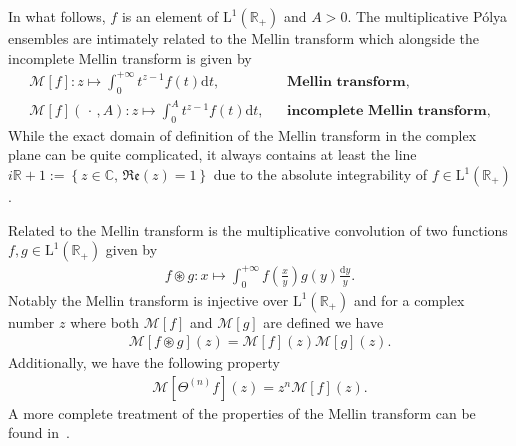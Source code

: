 \documentclass[pdflatex,sn-mathphys-num]{sn-jnl}
\theoremstyle{thmstyleone}
\numberwithin{equation}{section}
\newcommand{\R}{\mathbb{R}}
\newcommand{\C}{\mathbb{C}}
\begin{document}
In what follows, $f$ is an element of $\mathrm{L}^{1}\left(\R_{+}\right)$ and $A>0$. The multiplicative P\'olya ensembles are intimately related to the Mellin transform which alongside the incomplete Mellin transform is given by
\begin{align}\label{mellintransform1}
    \mathcal{M}\left [ f \right ]:z\mapsto \int_{0}^{+\infty}t^{z-1}f\left ( t \right )\mathrm{d}t, &&\textbf{Mellin transform},
    \\
    \mathcal{M}\left [ f \right ]\left(\,\cdot\,,A\right):z\mapsto \int_{0}^{A}t^{z-1}f\left ( t \right )\mathrm{d}t,&&\textbf{incomplete Mellin transform},\label{mellintransform1.inc}
\end{align}
While the exact domain of definition of the Mellin transform in the complex plane can be quite complicated, it always contains at least the line $i\R+1:=\left \{ z\in\C,\,\mathfrak{Re}\left ( z \right )=1 \right \}$ due to the absolute integrability of $f\in\mathrm{L}^{1}\left(\R_{+}\right)$.

Related to the Mellin transform is the multiplicative convolution of two functions $f,g\in\mathrm{L}^{1}\left(\R_{+}\right)$ given by
\begin{align}\label{multiplicativeconvolution}
    f\circledast g:x\mapsto \int_{0}^{+\infty}f\left ( \frac{x}{y} \right )g\left ( y \right )\frac{\mathrm{d}y}{y}.
\end{align}
Notably the Mellin transform is injective over $\mathrm{L}^{1}\left(\R_{+}\right)$ and for a complex number $z$ where both $\mathcal{M}\left [ f \right ]$ and $\mathcal{M}\left [ g \right ]$ are defined we have
\begin{align}
    \mathcal{M}\left [ f\circledast g \right ]\left(z\right)=\mathcal{M}\left [ f\right ]\left(z\right)\mathcal{M}\left [ g\right ]\left(z\right).
\end{align}
Additionally, we have the following property
\begin{align}\label{id:mellintheta}
    \mathcal{M}\left [ \Theta^{(n)}f\right ]\left(z\right)=z^{n}\mathcal{M}\left [ f\right ]\left(z\right).
\end{align}
A more complete treatment of the properties of the Mellin transform can be found in~\cite[Sec.~2]{kieburgProductsRandomMatrices2019}.
\end{document}

